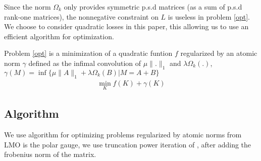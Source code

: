 Since the norm $\Omega_k$ only provides symmetric p.s.d matrices (as a sum of p.s.d rank-one matrices), the nonnegative constraint on $L$ is useless in problem \ref{opt}. 
We choose to consider quadratic losses in this paper, this allowing us to use an efficient algorithm for optimization.

Problem \ref{opt} is a minimization of a quadratic funtion $f$ regularized by an atomic norm $\gamma$  defined as the infimal convolution of $\mu\|.\|_{1}$ and $\lambda\Omega_k(.)$, $\gamma(M)=\inf\{\mu\|A\|_{1}+\lambda\Omega_k(B)|M=A+B\}$
\begin{align}
\label{opt_quad}
\min_{K} f(K)+ \gamma(K)
\end{align}


\subsection{Algorithm}
We use algorithm for optimizing problems regularized by atomic norms from \citet{vinyes2017}
LMO is the polar gauge,  we use truncation power iteration of \citet{yuan2013truncated}, after adding the frobenius norm of the matrix.





